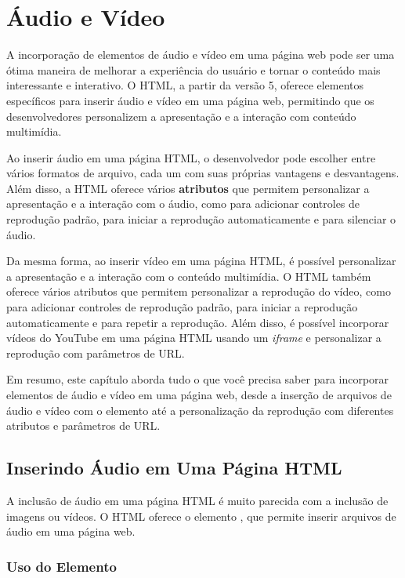 \chapter{Áudio e Vídeo}

A incorporação de elementos de áudio e vídeo em uma página web pode ser uma ótima maneira de melhorar a experiência do usuário e tornar o conteúdo mais interessante e interativo. O HTML, a partir da versão 5, oferece elementos específicos para inserir áudio e vídeo em uma página web, permitindo que os desenvolvedores personalizem a apresentação e a interação com conteúdo multimídia.

Ao inserir áudio em uma página HTML, o desenvolvedor pode escolher entre vários formatos de arquivo, cada um com suas próprias vantagens e desvantagens. Além disso, a HTML oferece vários \textbf{atributos} que permitem personalizar a apresentação e a interação com o áudio, como  para adicionar controles de reprodução padrão,  para iniciar a reprodução automaticamente e  para silenciar o áudio.

Da mesma forma, ao inserir vídeo em uma página HTML, é possível personalizar a apresentação e a interação com o conteúdo multimídia. O HTML também oferece vários atributos que permitem personalizar a reprodução do vídeo, como  para adicionar controles de reprodução padrão,  para iniciar a reprodução automaticamente e  para repetir a reprodução. Além disso, é possível incorporar vídeos do YouTube em uma página HTML usando um \textit{iframe} e personalizar a reprodução com parâmetros de URL.

Em resumo, este capítulo aborda tudo o que você precisa saber para incorporar elementos de áudio e vídeo em uma página web, desde a inserção de arquivos de áudio e vídeo com o elemento  até a personalização da reprodução com diferentes atributos e parâmetros de URL.

\section{Inserindo Áudio em Uma Página HTML}

A inclusão de áudio em uma página HTML é muito parecida com a inclusão de imagens ou vídeos. O HTML oferece o elemento , que permite inserir arquivos de áudio em uma página web.

\subsection{Uso do Elemento }


